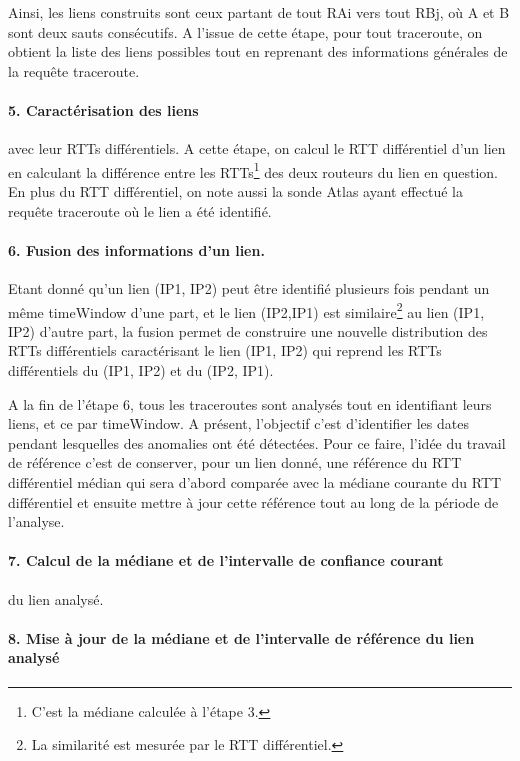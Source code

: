 \documentclass[]{report}
\begin{document}
Ainsi, les liens  construits sont ceux partant de tout RAi vers tout RBj, où A et B sont deux sauts consécutifs. A l'issue de cette étape, pour tout traceroute, on obtient la liste des liens possibles tout en reprenant des informations générales de la requête traceroute.

\paragraph{5. Caractérisation des liens} avec leur RTTs différentiels. A cette étape, on calcul le RTT différentiel d'un lien en calculant la différence entre les RTTs\footnote{C'est la médiane calculée à l'étape 3.} des deux routeurs du lien en question. En plus du RTT différentiel, on note aussi la sonde Atlas ayant effectué la requête traceroute où le lien a été identifié. 

\paragraph{6. Fusion des informations d'un lien. } Etant donné qu'un lien (IP1, IP2) peut être identifié plusieurs fois pendant un même timeWindow d'une part, et le lien (IP2,IP1) est similaire\footnote{La similarité est mesurée par le RTT différentiel.} au lien  (IP1, IP2) d'autre part, la fusion permet de construire une nouvelle distribution des RTTs différentiels caractérisant le lien (IP1, IP2) qui reprend les RTTs différentiels du (IP1, IP2) et du (IP2, IP1).


A la fin de l'étape 6, tous les traceroutes sont analysés tout en identifiant leurs liens, et ce par timeWindow. A présent, l'objectif c'est d'identifier les dates pendant lesquelles des anomalies ont été détectées. Pour ce faire, l'idée du travail de référence c'est de conserver, pour un lien donné, une référence du RTT différentiel médian qui sera d'abord comparée avec la médiane courante du RTT différentiel et ensuite mettre à jour cette référence tout au long de la période de l'analyse.

  
  \paragraph{7. Calcul de la médiane et de  l'intervalle de confiance courant } du lien analysé.
  
  \paragraph{8. Mise à jour de la médiane et de l'intervalle de  référence du lien analysé}
  
\end{document}
